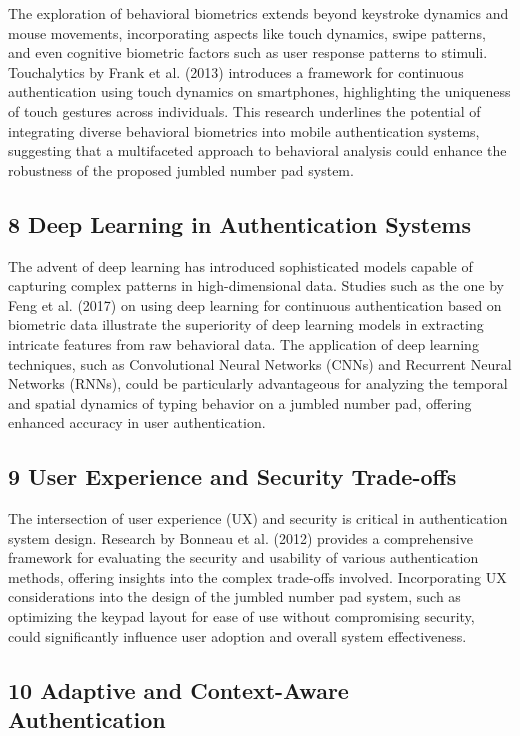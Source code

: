 \documentclass{article}
\begin{document}
The exploration of behavioral biometrics extends beyond keystroke dynamics and mouse movements, incorporating aspects like touch dynamics, swipe patterns, and even cognitive biometric factors such as user response patterns to stimuli. Touchalytics by Frank et al. (2013) introduces a framework for continuous authentication using touch dynamics on smartphones, highlighting the uniqueness of touch gestures across individuals. This research underlines the potential of integrating diverse behavioral biometrics into mobile authentication systems, suggesting that a multifaceted approach to behavioral analysis could enhance the robustness of the proposed jumbled number pad system.

\subsection*{8 Deep Learning in Authentication Systems}

The advent of deep learning has introduced sophisticated models capable of capturing complex patterns in high-dimensional data. Studies such as the one by Feng et al. (2017) on using deep learning for continuous authentication based on biometric data illustrate the superiority of deep learning models in extracting intricate features from raw behavioral data. The application of deep learning techniques, such as Convolutional Neural Networks (CNNs) and Recurrent Neural Networks (RNNs), could be particularly advantageous for analyzing the temporal and spatial dynamics of typing behavior on a jumbled number pad, offering enhanced accuracy in user authentication.

\subsection*{9 User Experience and Security Trade-offs}

The intersection of user experience (UX) and security is critical in authentication system design. Research by Bonneau et al. (2012) provides a comprehensive framework for evaluating the security and usability of various authentication methods, offering insights into the complex trade-offs involved. Incorporating UX considerations into the design of the jumbled number pad system, such as optimizing the keypad layout for ease of use without compromising security, could significantly influence user adoption and overall system effectiveness.

\subsection*{10 Adaptive and Context-Aware Authentication}
\end{document}
